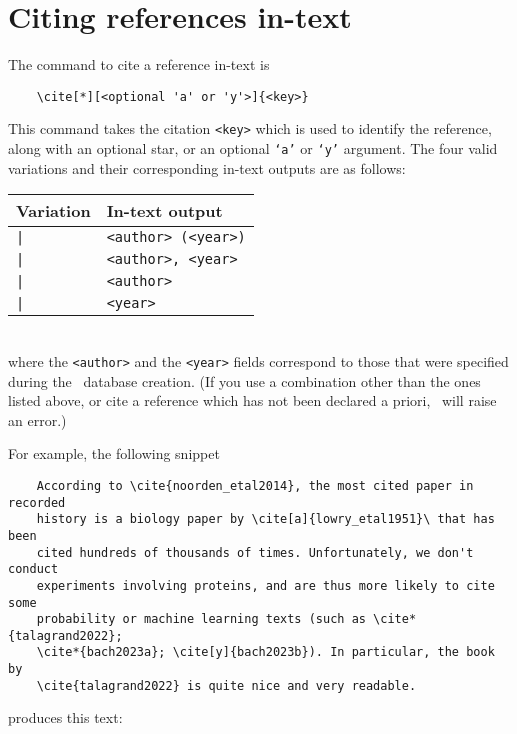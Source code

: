 \documentclass[letter, 11pt]{article}
\begin{document}
  \section{Citing references in-text}
  The command to cite a reference in-text is
  \begin{verbatim}
    \cite[*][<optional 'a' or 'y'>]{<key>}
  \end{verbatim}
  This command takes the citation \texttt{<key>} which is used to identify the reference, along with an optional star, or an optional \texttt{`a'} or \texttt{`y'} argument. The four valid variations and their corresponding in-text outputs are as follows:
  \begin{table}[!hbp]
    \centering
    \begin{tabular}{ll}
      \textbf{Variation} & \textbf{In-text output} \\
      \hline \hline
      \texttt|\cite{<key>}| & \texttt{<author> (<year>)} \\
      \hline
      \texttt|\cite*{<key>}| & \texttt{<author>, <year>} \\
      \hline
      \texttt|\cite[a]{<key>}| & \texttt{<author>} \\
      \hline
      \texttt|\cite[y]{<key>}| &\texttt{<year>}
    \end{tabular}
  \end{table}
  \\
  where the \texttt{<author>} and the \texttt{<year>} fields correspond to those that were specified during the \dumbib\ database creation. (If you use a combination other than the ones listed above, or cite a reference which has not been declared a priori, \dumbib\ will raise an error.)
  
  For example, the following snippet
  \begin{verbatim}
    According to \cite{noorden_etal2014}, the most cited paper in recorded
    history is a biology paper by \cite[a]{lowry_etal1951}\ that has been 
    cited hundreds of thousands of times. Unfortunately, we don't conduct
    experiments involving proteins, and are thus more likely to cite some
    probability or machine learning texts (such as \cite*{talagrand2022};
    \cite*{bach2023a}; \cite[y]{bach2023b}). In particular, the book by
    \cite{talagrand2022} is quite nice and very readable.
  \end{verbatim}
  produces this text:
  \begin{center}
  \end{center}
  
\end{document}

